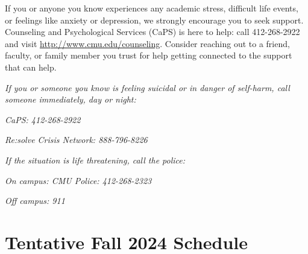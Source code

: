 \documentclass[11pt,letterpaper]{article}
\begin{document}
\medskip
\noindent
If you or anyone you know experiences any academic stress, difficult life events, or feelings like anxiety or depression, we strongly encourage you to seek support. Counseling and Psychological Services (CaPS) is here to help: call 412-268-2922 and visit \href{http://www.cmu.edu/counseling}{http://www.cmu.edu/counseling}. Consider reaching out to a friend, faculty, or family member you trust for help getting connected to the support that can help.

\medskip
\noindent
\textit{If you or someone you know is feeling suicidal or in danger of self-harm, call someone immediately, day or night:}

\textit{CaPS: 412-268-2922}

\textit{Re:solve Crisis Network: 888-796-8226}

\medskip
\noindent
\textit{If the situation is life threatening, call the police:}

\textit{On campus: CMU Police: 412-268-2323}

\textit{Off campus: 911}


\section*{Tentative Fall 2024 Schedule}
\end{document}
